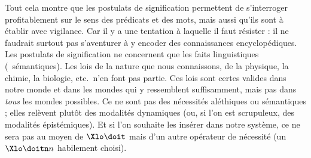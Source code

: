 Tout cela montre que les postulats de signification permettent de s'interroger profitablement sur le sens des prédicats et des mots, mais aussi qu'ils sont à établir avec vigilance. 
Car il y a une tentation à laquelle il faut résister : il ne faudrait surtout pas s'aventurer à y encoder des connaissances encyclopédiques. Les postulats de signification ne concernent que les faits linguistiques (\ie\ sémantiques). Les lois de la nature que nous connaissons, de la physique, la chimie, la biologie, etc.\ n'en font pas partie.  Ces lois sont certes valides dans notre monde et  dans les mondes qui y ressemblent suffisamment, mais pas dans \emph{tous} les mondes possibles.  Ce ne sont pas des nécessités aléthiques ou sémantiques ; elles relèvent plutôt des modalités dynamiques (ou, si l'on est scrupuleux, des modalités épistémiques). Et si l'on souhaite les insérer dans notre système, ce ne sera pas au moyen de $\Xlo\doit$ mais d'un autre opérateur de nécessité (un $\Xlo\doitn n$ habilement choisi). 

\largerpage[-1]

